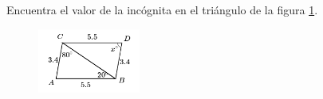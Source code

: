 \question[10]  Encuentra el valor de la incógnita en el triángulo de la figura \ref{fig:angle_triangle_24}.
\begin{figure}[H]
    \begin{center}
        \includegraphics[width=0.3\textwidth]{../images/angle_triangle_24.png}
    \end{center}
    \caption{}
    \label{fig:angle_triangle_24}
\end{figure}